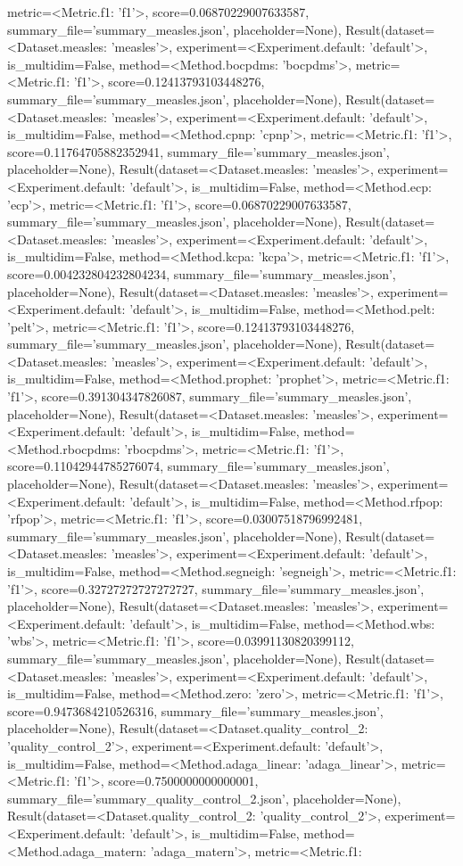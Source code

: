 metric=<Metric.f1: 'f1'>, score=0.06870229007633587, summary_file='summary_measles.json', placeholder=None), Result(dataset=<Dataset.measles: 'measles'>, experiment=<Experiment.default: 'default'>, is_multidim=False, method=<Method.bocpdms: 'bocpdms'>, metric=<Metric.f1: 'f1'>, score=0.12413793103448276, summary_file='summary_measles.json', placeholder=None), Result(dataset=<Dataset.measles: 'measles'>, experiment=<Experiment.default: 'default'>, is_multidim=False, method=<Method.cpnp: 'cpnp'>, metric=<Metric.f1: 'f1'>, score=0.11764705882352941, summary_file='summary_measles.json', placeholder=None), Result(dataset=<Dataset.measles: 'measles'>, experiment=<Experiment.default: 'default'>, is_multidim=False, method=<Method.ecp: 'ecp'>, metric=<Metric.f1: 'f1'>, score=0.06870229007633587, summary_file='summary_measles.json', placeholder=None), Result(dataset=<Dataset.measles: 'measles'>, experiment=<Experiment.default: 'default'>, is_multidim=False, method=<Method.kcpa: 'kcpa'>, metric=<Metric.f1: 'f1'>, score=0.004232804232804234, summary_file='summary_measles.json', placeholder=None), Result(dataset=<Dataset.measles: 'measles'>, experiment=<Experiment.default: 'default'>, is_multidim=False, method=<Method.pelt: 'pelt'>, metric=<Metric.f1: 'f1'>, score=0.12413793103448276, summary_file='summary_measles.json', placeholder=None), Result(dataset=<Dataset.measles: 'measles'>, experiment=<Experiment.default: 'default'>, is_multidim=False, method=<Method.prophet: 'prophet'>, metric=<Metric.f1: 'f1'>, score=0.391304347826087, summary_file='summary_measles.json', placeholder=None), Result(dataset=<Dataset.measles: 'measles'>, experiment=<Experiment.default: 'default'>, is_multidim=False, method=<Method.rbocpdms: 'rbocpdms'>, metric=<Metric.f1: 'f1'>, score=0.11042944785276074, summary_file='summary_measles.json', placeholder=None), Result(dataset=<Dataset.measles: 'measles'>, experiment=<Experiment.default: 'default'>, is_multidim=False, method=<Method.rfpop: 'rfpop'>, metric=<Metric.f1: 'f1'>, score=0.03007518796992481, summary_file='summary_measles.json', placeholder=None), Result(dataset=<Dataset.measles: 'measles'>, experiment=<Experiment.default: 'default'>, is_multidim=False, method=<Method.segneigh: 'segneigh'>, metric=<Metric.f1: 'f1'>, score=0.32727272727272727, summary_file='summary_measles.json', placeholder=None), Result(dataset=<Dataset.measles: 'measles'>, experiment=<Experiment.default: 'default'>, is_multidim=False, method=<Method.wbs: 'wbs'>, metric=<Metric.f1: 'f1'>, score=0.03991130820399112, summary_file='summary_measles.json', placeholder=None), Result(dataset=<Dataset.measles: 'measles'>, experiment=<Experiment.default: 'default'>, is_multidim=False, method=<Method.zero: 'zero'>, metric=<Metric.f1: 'f1'>, score=0.9473684210526316, summary_file='summary_measles.json', placeholder=None), Result(dataset=<Dataset.quality_control_2: 'quality_control_2'>, experiment=<Experiment.default: 'default'>, is_multidim=False, method=<Method.adaga_linear: 'adaga_linear'>, metric=<Metric.f1: 'f1'>, score=0.7500000000000001, summary_file='summary_quality_control_2.json', placeholder=None), Result(dataset=<Dataset.quality_control_2: 'quality_control_2'>, experiment=<Experiment.default: 'default'>, is_multidim=False, method=<Method.adaga_matern: 'adaga_matern'>, metric=<Metric.f1: 